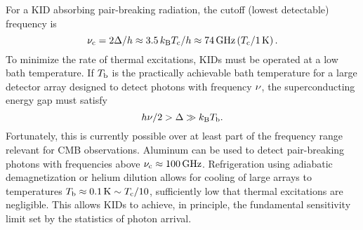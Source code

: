For a KID absorbing pair-breaking radiation, the cutoff (lowest detectable) frequency is
\begin{equation}
\nu_{\mathrm{c}} 
  =
  2 \Delta / h
  \approx
  3.5 \, k_\mathrm{B} T_{\mathrm{c}} / h
  \approx
  \SI{74}{GHz} \left( T_{\mathrm{c}} / \SI{1}{K} \right).
\end{equation}
To minimize the rate of thermal excitations, KIDs must be operated at a low bath temperature.
If $T_{\mathrm{b}}$ is the practically achievable bath temperature for a large detector array designed to detect photons with frequency $\nu$, the superconducting energy gap must satisfy
\begin{equation}
h \nu / 2
  >
  \Delta
  \gg
  k_\mathrm{B} T_{\mathrm{b}}.
\end{equation}
Fortunately, this is currently possible over at least part of the frequency range relevant for CMB observations.
Aluminum can be used to detect pair-breaking photons with frequencies above
$\nu_{\mathrm{c}} \approx \SI{100}{GHz}$.
Refrigeration using adiabatic demagnetization or helium dilution allows for cooling of large arrays to temperatures
$T_{\mathrm{b}} \approx \SI{0.1}{K} \sim T_{\mathrm{c}} / 10$,
sufficiently low that thermal excitations are negligible.
This allows KIDs to achieve, in principle, the fundamental sensitivity limit set by the statistics of photon arrival.
